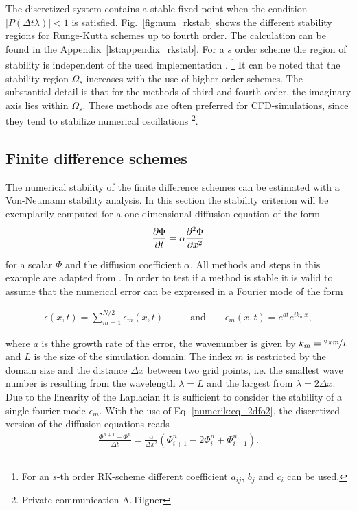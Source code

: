 The discretized system contains a stable fixed point when the condition $|P(\Delta t \lambda)| < 1$ is satisfied.
Fig.~\ref{fig:num_rkstab} shows the different stability regions for Runge-Kutta schemes up to fourth order.
The calculation can be found in the Appendix~\ref{lst:appendix_rkstab}.
For a $s$ order scheme the region of stability is independent of the used implementation \citep{canuto2007}.
\footnote{For an $s$-th order RK-scheme different coefficient $a_{ij}$, $b_j$ and $c_i$ can be used.}
It can be noted that the stability region $\Omega_s$ increases with the use of higher order schemes.
The substantial detail is that for the  methods of third and fourth order, the imaginary axis lies within $\Omega_s$.
These methods are often preferred for  CFD-simulations, since they tend to stabilize numerical oscillations \footnote{Private communication A.Tilgner}.

\subsection{Finite difference schemes}

The numerical stability of the finite difference schemes can be estimated with a Von-Neumann stability analysis.
In this section the stability criterion will be exemplarily computed for a one-dimensional diffusion equation of the form
\begin{align}
    \label{num:vne_diffusion_theo}
    \pdn[\Phi]{t} = \alpha  \pdn[^2\Phi]{x^2}
\end{align}

for a scalar $\Phi$ and  the diffusion coefficient $\alpha$.
All methods and steps in this example are adapted from \citep{janderson}.
In order to test if a method is stable it is valid to assume that the numerical error can be expressed in a Fourier mode of the form

\begin{align}
    \epsilon(x, t) = \sum_{m=1}^{N/2} \epsilon_m(x, t) \qquad &\text{and} \qquad  \epsilon_m(x, t) = e^{at}e^{i k_m x},
\end{align}

where $a$  is thhe growth rate of the error, the wavenumber is given by $k_m=\nicefrac{2\pi m}{L}$ and $L$ is the size of the simulation domain.
The index $m$ is restricted by the domain size and the distance $\Delta x$ between two grid points, i.e. the smallest wave number
is resulting from the wavelength $\lambda=L$ and the largest from $\lambda=2\Delta x$.
Due to the linearity of the Laplacian it is sufficient to consider the stability of a single fourier mode $\epsilon_m$.
With the use of Eq.  \ref{numerik:eq_2dfo2}, the discretized version of the diffusion equations reads
\begin{align}
    \label{num:neumann_diffusion_eq}
    \frac{\Phi^{n+1} - \Phi^n}{\Delta t} = \frac{\alpha}{\Delta x^2}\left(\Phi_{i+1}^n - 2\Phi_{i}^n + \Phi_{i-1}^n\right).
\end{align}

